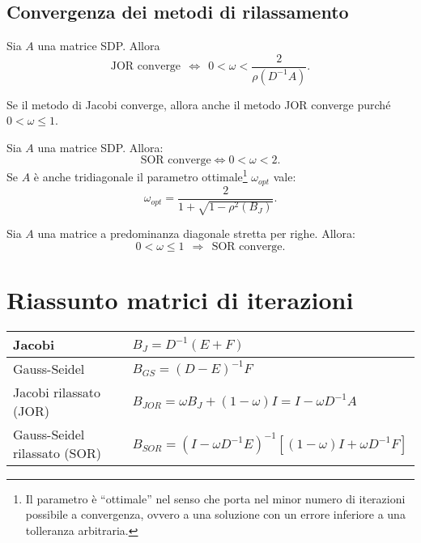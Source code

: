 \subsection{Convergenza dei metodi di rilassamento}
\spazioSecBox
\begin{theorem}
Sia $A$ una matrice SDP. Allora
\begin{equation*}
\text{JOR converge} \ \ \Leftrightarrow \ \ 0< \omega < \frac{2}{\rho \left( D^{-1} A\right)}.
\end{equation*}
\end{theorem}
\begin{theorem}
Se il metodo di Jacobi converge, allora anche il metodo JOR converge purché $0< \omega \leqslant 1$.
\end{theorem}
\begin{theorem}
Sia $A$ una matrice SDP. Allora:
\begin{equation*}
\text{SOR converge} \Leftrightarrow 0< \omega < 2.
\end{equation*}
Se $A$ è anche tridiagonale il parametro ottimale\footnote{Il parametro è ``ottimale'' nel senso che porta nel minor numero di iterazioni possibile a convergenza, ovvero a una soluzione con un errore inferiore a una tolleranza arbitraria.} $\omega _{opt}$ vale:
\begin{equation*}
\omega _{opt} =\frac{2}{1+\sqrt{1-\rho ^{2}( B_{J})}}.
\end{equation*}
\end{theorem}
\begin{theorem}
Sia $A$ una matrice a predominanza diagonale stretta per righe. Allora:
\begin{equation*}
0< \omega \leqslant 1\ \ \Rightarrow \ \ \text{SOR converge}.
\end{equation*}
\end{theorem}
\section{Riassunto matrici di iterazioni}
\begin{table}[H]
  \def\arraystretch{1.5}
  \begin{tabular}{|l|l|}
    \hline
    Jacobi                       & $B_{J} =D^{-1}( E+F)$ \\ \hline
    Gauss-Seidel                 & $B_{GS} =( D-E)^{-1} F$ \\ \hline
    Jacobi rilassato (JOR)       & $B_{JOR} =\omega B_{J} +( 1-\omega ) I=I-\omega D^{-1} A$ \\ \hline
    Gauss-Seidel rilassato (SOR) & $B_{SOR} =\left( I-\omega D^{-1} E\right)^{-1}\left[( 1-\omega ) I+\omega D^{-1} F\right]$ \\ \hline
  \end{tabular}
\end{table}

